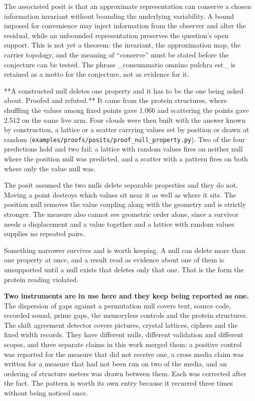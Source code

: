 The associated posit is that an approximate representation can conserve a chosen information invariant without bounding the underlying variability. A bound imposed for convenience may inject information from the observer and alter the residual, while an unbounded representation preserves the question's open support. This is not yet a theorem: the invariant, the approximation map, the carrier topology, and the meaning of ``conserve'' must be stated before the conjecture can be tested. The phrase \_consummatio omnino pulchra est\_ is retained as a motto for the conjecture, not as evidence for it.

**A constructed null deletes one property and it has to be the one being asked about. Proofed and refuted.** It came from the protein structures, where shuffling the values among fixed points gave 1.066 and scattering the points gave 2.512 on the same live arm. Four clouds were then built with the answer known by construction, a lattice or a scatter carrying values set by position or drawn at random (\texttt{examples/\allowbreak{}proofs/\allowbreak{}posits/\allowbreak{}proof\_\allowbreak{}null\_\allowbreak{}property.\allowbreak{}py}). Two of the four predictions hold and two fail: a lattice with random values fires on neither null where the position null was predicted, and a scatter with a pattern fires on both where only the value null was.

The posit assumed the two nulls delete separable properties and they do not. Moving a point destroys which values sit near it as well as where it sits. The position null removes the value coupling along with the geometry and is strictly stronger. The measure also cannot see geometric order alone, since a survivor needs a displacement and a value together and a lattice with random values supplies no repeated pairs.

Something narrower survives and is worth keeping. A null can delete more than one property at once, and a result read as evidence about one of them is unsupported until a null exists that deletes only that one. That is the form the protein reading violated.

\textbf{Two instruments are in use here and they keep being reported as one.} The dispersion of gaps against a permutation null covers text, source code, recorded sound, prime gaps, the memoryless controls and the protein structures. The shift agreement detector covers pictures, crystal lattices, ciphers and the fixed width records. They have different nulls, different validation and different scopes, and three separate claims in this work merged them: a positive control was reported for the measure that did not receive one, a cross media claim was written for a measure that had not been run on two of the media, and an ordering of structure meters was drawn between them. Each was corrected after the fact. The pattern is worth its own entry because it recurred three times without being noticed once.

